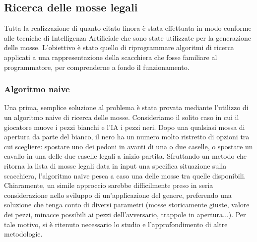 \subsection{Ricerca delle mosse legali}
Tutta la realizzazione di quanto citato finora è stata effettuata in modo conforme alle tecniche di Intelligenza Artificiale che sono state utilizzate per la generazione delle mosse. L'obiettivo è stato quello di riprogrammare algoritmi di ricerca applicati a una rappresentazione della scacchiera che fosse familiare al programmatore, per comprenderne a fondo il funzionamento. 

\subsubsection{Algoritmo naive}
Una prima, semplice soluzione al problema è stata provata mediante l'utilizzo di un algoritmo naive di ricerca delle mosse. Consideriamo il solito caso in cui il giocatore muove i pezzi bianchi e l'IA i pezzi neri. Dopo una qualsiasi mossa di apertura da parte del bianco, il nero ha un numero molto ristretto di opzioni tra cui scegliere: spostare uno dei pedoni in avanti di una o due caselle, o spostare un cavallo in una delle due caselle legali a inizio partita. Sfruttando un metodo che ritorna la lista di mosse legali data in input una specifica situazione sulla scacchiera, l'algoritmo naive pesca a caso una delle mosse tra quelle disponibili. Chiaramente, un simile approccio sarebbe difficilmente preso in seria considerazione nello sviluppo di un'applicazione del genere, preferendo una soluzione che tenga conto di diversi parametri (mosse storicamente giuste, valore dei pezzi, minacce possibili ai pezzi dell'avversario, trappole in apertura...). Per tale motivo, si è ritenuto necessario lo studio e l'approfondimento di altre metodologie. 

